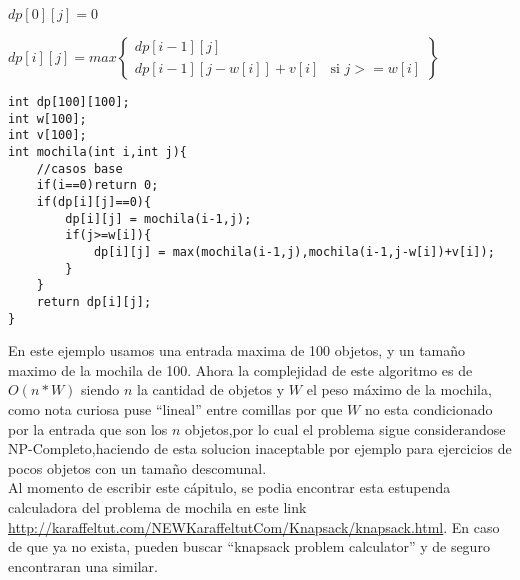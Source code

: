 $dp[0][j] = 0$

$dp[i][j]= max \left\{\begin{array}{lr} dp[i-1][j]\\dp[i-1][j-w[i]]+v[i] & \text{si } j>=w[i] \end{array}\right\}$

\begin{minipage}{\textwidth}
\begin{lstlisting}[style=C,caption=mochila.cpp]
int dp[100][100];
int w[100];
int v[100];
int mochila(int i,int j){
    //casos base
    if(i==0)return 0;
    if(dp[i][j]==0){
        dp[i][j] = mochila(i-1,j);
        if(j>=w[i]){
            dp[i][j] = max(mochila(i-1,j),mochila(i-1,j-w[i])+v[i]);
        }
    }
    return dp[i][j];
}
\end{lstlisting}
\end{minipage}

En este ejemplo usamos una entrada maxima de 100 objetos, y un tamaño maximo de la mochila de 100. Ahora la complejidad de este algoritmo es de $O(n*W)$ siendo $n$ la cantidad de objetos y $W$ el peso máximo de la mochila, como nota curiosa puse ``lineal'' entre comillas por que $W$ no esta condicionado por la entrada que son los $n$ objetos,por lo cual el problema sigue considerandose NP-Completo,haciendo de esta solucion inaceptable por ejemplo para ejercicios de pocos objetos con un tamaño descomunal.
\\Al momento de escribir este cápitulo, se podia encontrar esta estupenda calculadora del problema de mochila en este link \url{http://karaffeltut.com/NEWKaraffeltutCom/Knapsack/knapsack.html}. En caso de que ya no exista, pueden buscar ``knapsack problem calculator'' y de seguro encontraran una similar.
